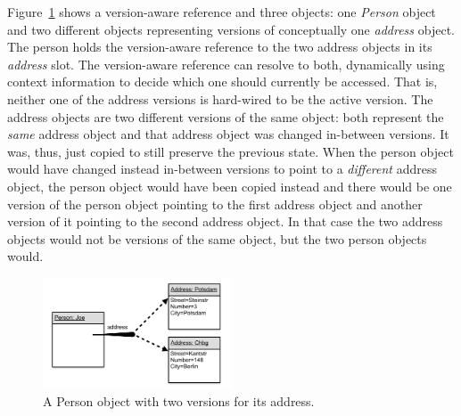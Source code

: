 Figure~\ref{fig:VersionAwareReference} shows a version-aware reference and three objects:
one \emph{Person} object and two different objects representing versions of conceptually one \emph{address} object.
The person holds the version-aware reference to the two address objects in its \emph{address} slot.
The version-aware reference can resolve to both, dynamically using context information to decide which one should currently be accessed.
That is, neither one of the address versions is hard-wired to be the active version.
The address objects are two different versions of the same object: both represent the \emph{same} address object and that address object was changed in-between versions.
It was, thus, just copied to still preserve the previous state.
When the person object would have changed instead in-between versions to point to a \emph{different} address object, the person object would have been copied instead and there would be one version of the person object pointing to the first address object and another version of it pointing to the second address object.
In that case the two address objects would not be versions of the same object, but the two person objects would.

\begin{figure}[h]
    \centering
    \includegraphics[width=0.5\textwidth]{figures/versionAwareReference.png}
    \caption{A Person object with two versions for its address.}
    \label{fig:VersionAwareReference}
\end{figure}

